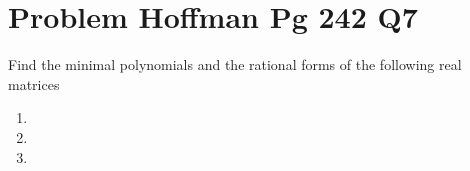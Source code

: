 \documentclass[journal,12pt]{IEEEtran}
\begin{document}
\renewcommand{\thefigure}{\theenumi}
\renewcommand{\thetable}{\theenumi}

\section{\textbf{Problem Hoffman Pg 242 Q7}}
 Find the minimal polynomials and the rational forms of  the following real matrices\\
 \begin{enumerate}
     \item {}
     \item {}
     \item \myvec{\cos\theta&\sin\theta\\-\sin\theta&\cos\theta}
 \end{enumerate}

 
\end{document}
